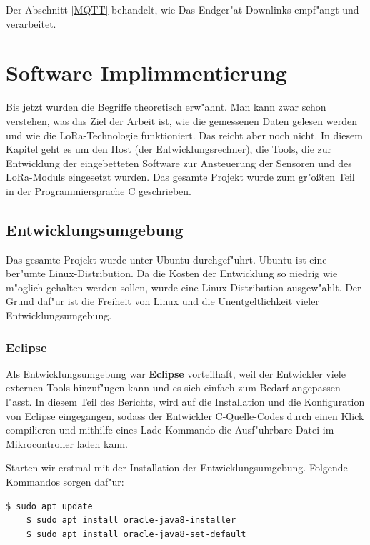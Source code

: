Der Abschnitt \ref{MQTT} behandelt, wie Das Endger"at Downlinks empf"angt und verarbeitet.

\chapter{Software Implimmentierung}\label{Soft-Ent}
Bis jetzt wurden die Begriffe theoretisch erw"ahnt. Man kann zwar schon 
verstehen, was das Ziel der Arbeit ist, wie die gemessenen Daten gelesen 
werden und wie die LoRa-Technologie funktioniert. Das reicht aber noch nicht. 
In diesem Kapitel geht es um den Host (der Entwicklungsrechner), die 
Tools, die zur Entwicklung der eingebetteten Software zur Ansteuerung 
der Sensoren und des LoRa-Moduls eingesetzt wurden. Das gesamte Projekt 
wurde zum gr"o\ss{}ten Teil in der Programmiersprache C geschrieben. 


\section{Entwicklungsumgebung}
Das gesamte Projekt wurde unter Ubuntu durchgef"uhrt. Ubuntu ist eine 
ber"umte Linux-Distribution. Da die Kosten der Entwicklung so niedrig wie 
m"oglich gehalten werden sollen, wurde eine Linux-Distribution 
ausgew"ahlt. Der Grund daf"ur ist die Freiheit von Linux und die 
Unentgeltlichkeit vieler Entwicklungsumgebung. 

\subsection{Eclipse}

Als Entwicklungsumgebung war \textbf{Eclipse} vorteilhaft, weil der 
Entwickler viele externen Tools hinzuf"ugen kann und es sich einfach 
zum Bedarf angepassen l"asst. In diesem Teil des Berichts, wird auf 
die Installation und die Konfiguration von Eclipse eingegangen, sodass  
der Entwickler C-Quelle-Codes durch einen Klick compilieren und mithilfe eines
Lade-Kommando die Ausf"uhrbare Datei im Mikrocontroller laden kann. 

\vspace{2cm}
Starten wir erstmal mit der Installation der Entwicklungsumgebung. 
Folgende Kommandos sorgen daf"ur:

\begin{lstlisting}[frame=single]
	$ sudo apt update
	$ sudo apt install oracle-java8-installer
	$ sudo apt install oracle-java8-set-default
\end{lstlisting}

